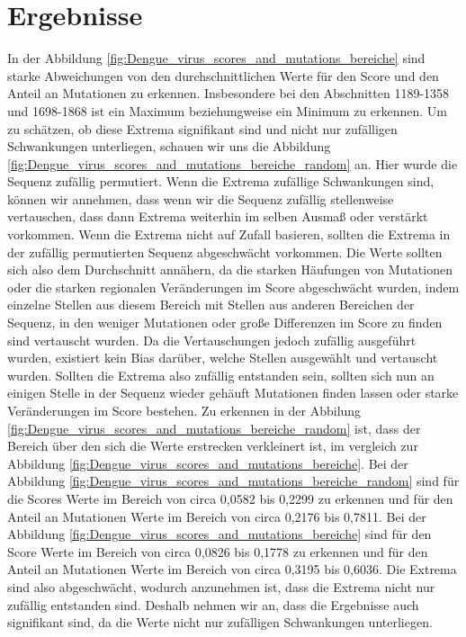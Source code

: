 \documentclass[german,version-2022-01]{uzl-thesis}
\begin{document}
\chapter{Ergebnisse}
In der Abbildung \ref{fig:Dengue_virus_scores_and_mutations_bereiche} sind starke Abweichungen von den durchschnittlichen Werte f\"ur den Score und den Anteil an Mutationen zu erkennen. Insbesondere bei den Abschnitten 1189-1358 und 1698-1868 ist ein Maximum beziehungweise ein Minimum zu erkennen. Um zu sch\"atzen, ob diese Extrema signifikant sind und nicht nur zuf\"alligen Schwankungen unterliegen, schauen wir uns die Abbildung \ref{fig:Dengue_virus_scores_and_mutations_bereiche_random} an. Hier wurde die Sequenz zuf\"allig permutiert. Wenn die Extrema zuf\"allige Schwankungen sind, k\"onnen wir annehmen, dass wenn wir die Sequenz zuf\"allig stellenweise vertauschen, dass dann Extrema weiterhin im selben Ausma\ss{} oder verst\"arkt vorkommen. Wenn die Extrema nicht auf Zufall basieren, sollten die Extrema in der zuf\"allig permutierten Sequenz abgeschw\"acht vorkommen. Die Werte sollten sich also dem Durchschnitt ann\"ahern, da die starken H\"aufungen von Mutationen oder die starken regionalen Ver\"anderungen im Score abgeschw\"acht wurden, indem einzelne Stellen aus diesem Bereich mit Stellen aus anderen Bereichen der Sequenz, in den weniger Mutationen oder gro\ss{}e Differenzen im Score zu finden sind vertauscht wurden. Da die Vertauschungen jedoch zuf\"allig ausgef\"uhrt wurden, existiert kein Bias dar\"uber, welche Stellen ausgew\"ahlt und vertauscht wurden. Sollten die Extrema also zuf\"allig entstanden sein, sollten sich nun an einigen Stelle in der Sequenz wieder geh\"auft Mutationen finden lassen oder starke Ver\"anderungen im Score bestehen. 
Zu erkennen in der Abbilung \ref{fig:Dengue_virus_scores_and_mutations_bereiche_random} ist, dass der Bereich \"uber den sich die Werte erstrecken verkleinert ist, im vergleich zur Abbildung \ref{fig:Dengue_virus_scores_and_mutations_bereiche}. Bei der Abbildung \ref{fig:Dengue_virus_scores_and_mutations_bereiche_random} sind f\"ur die Scores Werte im Bereich von circa 0,0582 bis 0,2299 zu erkennen und f\"ur den Anteil an Mutationen Werte im Bereich von circa 0,2176 bis 0,7811. Bei der Abbildung \ref{fig:Dengue_virus_scores_and_mutations_bereiche} sind f\"ur den Score Werte im Bereich von circa 0,0826 bis 0,1778 zu erkennen und f\"ur den Anteil an Mutationen Werte im Bereich von circa 0,3195 bis 0,6036. Die Extrema sind also abgeschw\"acht, wodurch anzunehmen ist, dass die Extrema nicht nur zuf\"allig entstanden sind. Deshalb nehmen wir an, dass die Ergebnisse auch signifikant sind, da die Werte nicht nur zuf\"alligen Schwankungen unterliegen.  
\end{document}
